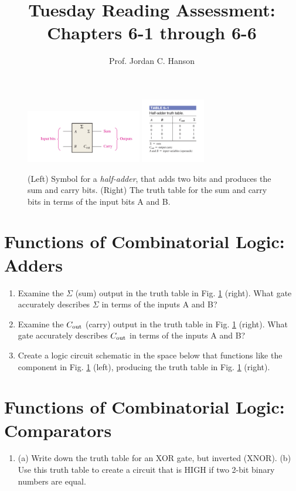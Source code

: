 \documentclass{article}
\begin{document}
\title{Tuesday Reading Assessment: Chapters 6-1 through 6-6}
\author{Prof. Jordan C. Hanson}

\maketitle

\begin{figure}[ht]
\centering
\includegraphics[width=0.45\textwidth]{figures/adder1.pdf} \hspace{0.5cm}
\includegraphics[width=0.25\textwidth]{figures/adder2.pdf}
\caption{\label{fig:1} (Left) Symbol for a \textit{half-adder}, that adds two bits and produces the sum and carry bits. (Right) The truth table for the sum and carry bits in terms of the input bits A and B.}
\end{figure}

\section{Functions of Combinatorial Logic: Adders}

\begin{enumerate}
\item Examine the $\Sigma$ (sum) output in the truth table in Fig. \ref{fig:1} (right).  What gate accurately describes $\Sigma$ in terms of the inputs A and B? \\ \vspace{0.5cm}
\item Examine the $C_{\rm out}$ (carry) output in the truth table in Fig. \ref{fig:1} (right).  What gate accurately describes $C_{\rm out}$ in terms of the inputs A and B? \\ \vspace{0.5cm}
\item Create a logic circuit schematic in the space below that functions like the component in Fig. \ref{fig:1} (left), producing the truth table in Fig. \ref{fig:1} (right). \\ \vspace{2.0cm}
\end{enumerate}

\section{Functions of Combinatorial Logic: Comparators}

\begin{enumerate}
\item (a) Write down the truth table for an XOR gate, but inverted (XNOR). (b) Use this truth table to create a circuit that is HIGH if two 2-bit binary numbers are equal.
\end{enumerate}
\end{document}
